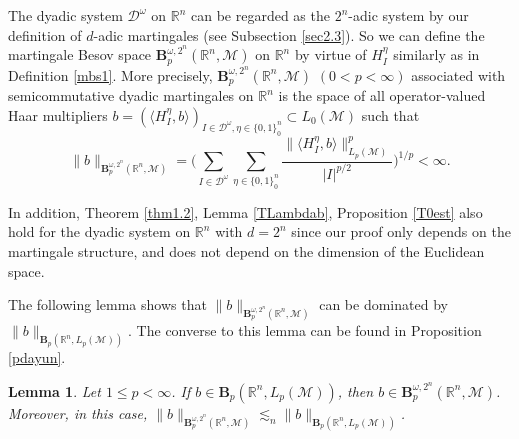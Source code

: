 \documentclass[oneside,english,a4wide]{amsart}
\numberwithin{equation}{section}
\numberwithin{figure}{section}
\theoremstyle{plain}
\theoremstyle{plain}
\theoremstyle{definition}
\theoremstyle{plain}
\newtheorem{lemma}[thm]{Lemma}
\theoremstyle{remark}
\theoremstyle{definition}
\theoremstyle{remark}
\theoremstyle{definition}
\newcommand{\M}{{\mathcal M}}
\newcommand{\8}{\infty}
\begin{document}
The dyadic system $\mathcal{ D}^\omega$ on $\mathbb{R}^n$ can be regarded as the $2^n$-adic system by our definition of $d$-adic martingales (see Subsection \ref{sec2.3}). So we can define the martingale Besov space $\pmb{B}_p^{\omega, 2^n}(\mathbb{R}^n,\mathcal{M})$ on $\mathbb{R}^n$ by virtue of $H_I^\eta$ similarly as in Definition \ref{mbs1}. More precisely, $\pmb{B}_p^{\omega, 2^n}(\mathbb{R}^n,\M)$ $(0<p<\8)$ associated with semicommutative dyadic martingales on $\mathbb{R}^n$ is the space of all operator-valued Haar multipliers $b=(\langle H_I^\eta,b\rangle)_{I\in \mathcal{D}^\omega, \eta\in\{0,1\}^n_0}\subset L_0(\M)$ such that
\begin{equation}\label{Bpw2nrnm}
	\|b\|_{\pmb{B}_p^{\omega, 2^n}(\mathbb{R}^n,\M)}=\biggl(\sum_{I\in \mathcal{D}^\omega}\sum_{\eta\in\{0,1\}^n_0}\frac{\|\langle H_I^\eta,b\rangle\|^p_{L_p{(\mathcal{M})}}}{|I|^{p/2}}\biggr)^{1/p}<\infty.
\end{equation}

In addition, Theorem \ref{thm1.2}, Lemma \ref{TLambdab}, Proposition \ref{T0est} also hold for the dyadic system on $\mathbb{R}^n$ with $d=2^n$ since our proof only depends on the martingale structure, and does not depend on the dimension of the Euclidean space. 

The following lemma shows that $\|b\|_{\pmb{B}_p^{\omega, 2^n}(\mathbb{R}^n,\mathcal{M})}$ can be dominated by $\|b\|_{\pmb{B}_p(\mathbb{R}^n,L_p(\mathcal{M}))}$. The converse to this lemma can be found in Proposition \ref{pdayun}.

\begin{lemma}\label{Comparison}
	Let $1\leq p<\infty$. If $b\in\pmb{B}_p(\mathbb{R}^n,L_p(\mathcal{M}))$, then $b\in\pmb{B}_p^{\omega, 2^n}(\mathbb{R}^n,\mathcal{M})$. Moreover, in this case, $\|b\|_{\pmb{B}_p^{\omega, 2^n}(\mathbb{R}^n,\mathcal{M})}\lesssim_{n} \|b\|_{\pmb{B}_p(\mathbb{R}^n,L_p(\mathcal{M}))}$.
\end{lemma}	
\end{document}
